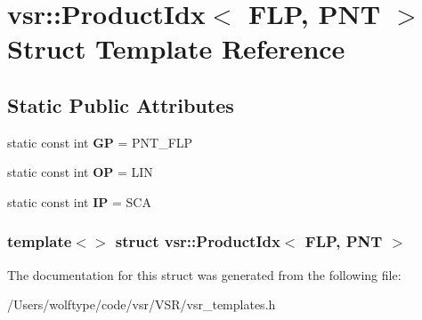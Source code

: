 \hypertarget{structvsr_1_1_product_idx_3_01_f_l_p_00_01_p_n_t_01_4}{\section{vsr\-:\-:Product\-Idx$<$ F\-L\-P, P\-N\-T $>$ Struct Template Reference}
\label{structvsr_1_1_product_idx_3_01_f_l_p_00_01_p_n_t_01_4}
}
\subsection*{Static Public Attributes}
\begin{DoxyCompactItemize}
\item 
\hypertarget{structvsr_1_1_product_idx_3_01_f_l_p_00_01_p_n_t_01_4_a4313962a1a07048b3481de5b5acb441b}{static const int {\bfseries G\-P} = P\-N\-T\-\_\-\-F\-L\-P}\label{structvsr_1_1_product_idx_3_01_f_l_p_00_01_p_n_t_01_4_a4313962a1a07048b3481de5b5acb441b}

\item 
\hypertarget{structvsr_1_1_product_idx_3_01_f_l_p_00_01_p_n_t_01_4_a2b1a5877c84e888dc0d47508041f8b49}{static const int {\bfseries O\-P} = L\-I\-N}\label{structvsr_1_1_product_idx_3_01_f_l_p_00_01_p_n_t_01_4_a2b1a5877c84e888dc0d47508041f8b49}

\item 
\hypertarget{structvsr_1_1_product_idx_3_01_f_l_p_00_01_p_n_t_01_4_a1194f6a5e0e630621a7e99852e4f6a0e}{static const int {\bfseries I\-P} = S\-C\-A}\label{structvsr_1_1_product_idx_3_01_f_l_p_00_01_p_n_t_01_4_a1194f6a5e0e630621a7e99852e4f6a0e}

\end{DoxyCompactItemize}
\subsubsection*{template$<$$>$ struct vsr\-::\-Product\-Idx$<$ F\-L\-P, P\-N\-T $>$}



The documentation for this struct was generated from the following file\-:\begin{DoxyCompactItemize}
\item 
/\-Users/wolftype/code/vsr/\-V\-S\-R/vsr\-\_\-templates.\-h\end{DoxyCompactItemize}
